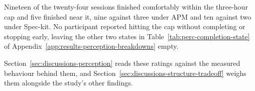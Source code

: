 Nineteen of the twenty-four sessions finished comfortably within the three-hour cap and five finished near it, nine against three under APM and ten against two under Spec-kit. No participant reported hitting the cap without completing or stopping early, leaving the other two states in Table~\ref{tab:perc-completion-state} of Appendix~\ref{app:results-perception-breakdowns} empty.

Section~\ref{sec:discussions-perception} reads these ratings against the measured behaviour behind them, and Section~\ref{sec:discussions-structure-tradeoff} weighs them alongside the study's other findings.
